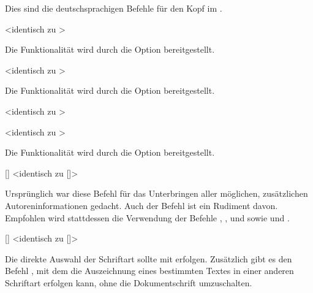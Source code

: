 \begin{DeclareEntity}{}
\begin{Declaration}
\begin{Declaration}
\begin{Declaration}
\begin{Declaration}
Dies sind die deutschsprachigen Befehle für den Kopf im \CD.
\end{Declaration}
\end{Declaration}
\end{Declaration}
\end{Declaration}

\begin{Declaration}
  {}
  <identisch zu >
\printdeclarationlist

Die Funktionalität wird durch die Option  bereitgestellt.
\end{Declaration}

\begin{Declaration}
  {}
  <identisch zu >
\printdeclarationlist

Die Funktionalität wird durch die Option  bereitgestellt.
\end{Declaration}

\begin{Declaration}
  {}
  <identisch zu >
\begin{Declaration}
  {}
  <identisch zu >
\printdeclarationlist

Die Funktionalität wird durch die Option  bereitgestellt.
\end{Declaration}
\end{Declaration}

\begin{Declaration}
  {[]}
  <identisch zu []>
\printdeclarationlist

Ursprünglich war diese Befehl für das Unterbringen aller möglichen, 
zusätzlichen Autoreninformationen gedacht. Auch der Befehl  
ist ein Rudiment davon. Empfohlen wird stattdessen die Verwendung der Befehle 
, ,  und 
 sowie  und .
\end{Declaration}

\begin{Declaration}
  {[]}
  <identisch zu []>
\printdeclarationlist

Die direkte Auswahl der Schriftart sollte mit  erfolgen. 
Zusätzlich gibt es den Befehl , mit dem die Auszeichnung 
eines bestimmten Textes in einer anderen Schriftart erfolgen kann, ohne die 
Dokumentschrift umzuschalten.
\end{Declaration}
%




\end{DeclareEntity}
